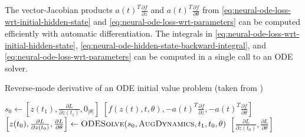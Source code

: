 The vector-Jacobian products $a(t)^T\frac{\partial f}{\partial z}$ and $a(t)^T\frac{\partial f}{\partial \theta}$ from \autoref{eq:neural-ode-loss-wrt-initial-hidden-state} and \autoref{eq:neural-ode-loss-wrt-parameters} can be computed efficiently with automatic differentiation.
The integrals in \autoref{eq:neural-ode-loss-wrt-initial-hidden-state}, \autoref{eq:neural-ode-hidden-state-backward-integral}, and \autoref{eq:neural-ode-loss-wrt-parameters} can be computed in a single call to an \gls{ODE} solver.

\begin{algorithm}
    \caption{Reverse-mode derivative of an ODE initial value problem (taken from \cite{chenNeuralOrdinaryDifferential2019})}
    \label{alg:neural-ode-reverse-mode-diff}
    \begin{algorithmic}
            \State $s_0 \gets \left[z(t_1), \frac{\partial L}{\partial z(t_1)}, 0_{|\theta|}\right]$
                \State \Return $\left[f(z(t), t, \theta), -a(t)^T\frac{\partial f}{\partial z}, -a(t)^T\frac{\partial f}{\partial \theta}\right]$
            \EndFunction
            \State $\left[z(t_0), \frac{\partial L}{\partial z(t_0)}, \frac{\partial L}{\partial \theta}\right] \gets \Call{ODESolve}{s_0, \textproc{AugDynamics}, t_1, t_0, \theta}$
            \State \Return $\left[\frac{\partial L}{\partial z(t_0)}, \frac{\partial L}{\partial \theta}\right]$
        \EndFunction
    \end{algorithmic}
\end{algorithm}